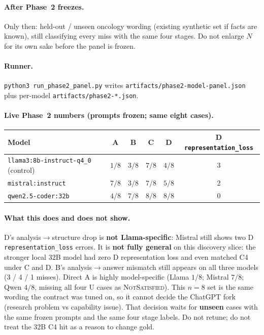 \documentclass[11pt,a4paper]{article}
\newcommand{\nsat}{\textsc{NotSatisfied}}
\begin{document}
\paragraph{After Phase~2 freezes.}
Only then: held-out / unseen oncology wording (existing synthetic set if facts are known), still classifying every miss with the same four stages.
Do not enlarge $N$ for its own sake before the panel is frozen.

\paragraph{Runner.}
\texttt{python3 run\_phase2\_panel.py} writes \texttt{artifacts/phase2-model-panel.json} plus per-model \texttt{artifacts/phase2-*.json}.

\paragraph{Live Phase~2 numbers (prompts frozen; same eight cases).}
\begin{center}
\begin{tabular}{lccccc}
\toprule
Model & A & B & C & D & D \texttt{representation\_loss} \\
\midrule
\texttt{llama3:8b-instruct-q4\_0} (control) & $1/8$ & $3/8$ & $7/8$ & $4/8$ & 3 \\
\texttt{mistral:instruct} & $7/8$ & $3/8$ & $7/8$ & $5/8$ & 2 \\
\texttt{qwen2.5-coder:32b} & $4/8$ & $7/8$ & $8/8$ & $8/8$ & 0 \\
\bottomrule
\end{tabular}
\end{center}

\paragraph{What this does and does not show.}
D's analysis$\rightarrow$structure drop is \textbf{not Llama-specific}: Mistral still shows two D \texttt{representation\_loss} errors.
It is \textbf{not fully general} on this discovery slice: the stronger local 32B model had zero D representation loss and even matched C4 under C and D.
B's analysis$\rightarrow$answer mismatch still appears on all three models (3 / 4 / 1 misses).
Direct A is highly model-specific (Llama $1/8$; Mistral $7/8$; Qwen $4/8$, missing all four U cases as \nsat).
This $n=8$ set is the same wording the contract was tuned on, so it cannot decide the ChatGPT fork (research problem vs capability issue).
That decision waits for \textbf{unseen} cases with the same frozen prompts and the same four stage labels.
Do not retune; do not treat the 32B C4 hit as a reason to change gold.
\end{document}
